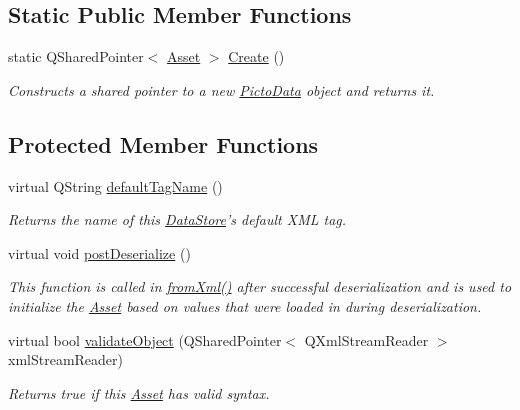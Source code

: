 \subsection*{Static Public Member Functions}
\begin{DoxyCompactItemize}
\item 
static Q\-Shared\-Pointer$<$ \hyperlink{class_picto_1_1_asset}{Asset} $>$ \hyperlink{class_picto_1_1_picto_data_aaa430dcdc885505c40a9f3159afaaa54}{Create} ()
\begin{DoxyCompactList}\small\item\em Constructs a shared pointer to a new \hyperlink{class_picto_1_1_picto_data}{Picto\-Data} object and returns it. \end{DoxyCompactList}\end{DoxyCompactItemize}
\subsection*{Protected Member Functions}
\begin{DoxyCompactItemize}
\item 
virtual Q\-String \hyperlink{class_picto_1_1_picto_data_ae5c3d9801e509f9045be5c5d9a6aa597}{default\-Tag\-Name} ()
\begin{DoxyCompactList}\small\item\em Returns the name of this \hyperlink{class_picto_1_1_data_store}{Data\-Store}'s default X\-M\-L tag. \end{DoxyCompactList}\item 
virtual void \hyperlink{class_picto_1_1_picto_data_ad6a34eb605a263ff1f69aa87e2095c2f}{post\-Deserialize} ()
\begin{DoxyCompactList}\small\item\em This function is called in \hyperlink{class_picto_1_1_asset_a8bed4da09ecb1c07ce0dab313a9aba67}{from\-Xml()} after successful deserialization and is used to initialize the \hyperlink{class_picto_1_1_asset}{Asset} based on values that were loaded in during deserialization. \end{DoxyCompactList}\item 
virtual bool \hyperlink{class_picto_1_1_picto_data_ad3c904629ebd1ecc9bd488b3bc53ee95}{validate\-Object} (Q\-Shared\-Pointer$<$ Q\-Xml\-Stream\-Reader $>$ xml\-Stream\-Reader)
\begin{DoxyCompactList}\small\item\em Returns true if this \hyperlink{class_picto_1_1_asset}{Asset} has valid syntax. \end{DoxyCompactList}\end{DoxyCompactItemize}

